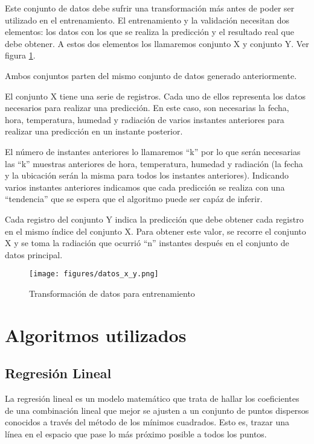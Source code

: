 Este conjunto de datos debe sufrir una transformación más antes de poder ser utilizado en el entrenamiento. El entrenamiento y la validación necesitan dos elementos: los datos con los que se realiza la predicción y el resultado real que debe obtener. A estos dos elementos los llamaremos conjunto X y conjunto Y. Ver figura \ref{x_y}.

Ambos conjuntos parten del mismo conjunto de datos generado anteriormente.

El conjunto X tiene una serie de registros. Cada uno de ellos representa los datos necesarios para realizar una predicción. En este caso, son necesarias la fecha, hora, temperatura, humedad y radiación de varios instantes anteriores para realizar una predicción en un instante posterior.

El número de instantes anteriores lo llamaremos ``k'' por lo que serán necesarias las ``k'' muestras anteriores de hora, temperatura, humedad y radiación (la fecha y la ubicación serán la misma para todos los instantes anteriores). Indicando varios instantes anteriores indicamos que cada predicción se realiza con una ``tendencia'' que se espera que el algoritmo puede ser capáz de inferir.

Cada registro del conjunto Y indica la predicción que debe obtener cada registro en el mismo índice del conjunto X. Para obtener este valor, se recorre el conjunto X y se toma la radiación que ocurrió ``n'' instantes después en el conjunto de datos principal.

\begin{figure}[htb]
	\begin{center}
		\texttt{[image: figures/datos\_x\_y.png]}
		\caption{Transformación de datos para entrenamiento \label{x_y}}
	\end{center}
\end{figure}

\section{Algoritmos utilizados}
\label{makereference5.3}
	\subsection{Regresión Lineal}
	\label{makereference5.3.1}

	La regresión lineal es un modelo matemático que trata de hallar los coeficientes de una combinación lineal que mejor se ajusten a un conjunto de puntos dispersos conocidos a través del método de los mínimos cuadrados. Esto es, trazar una línea en el espacio que pase lo más próximo posible a todos los puntos.

